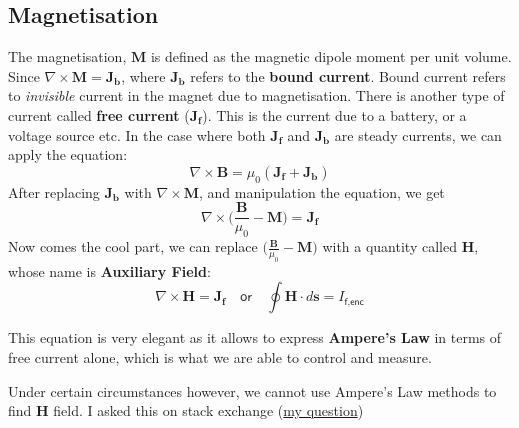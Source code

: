 \subsection{Magnetisation}
The magnetisation, $\mathbf{M}$ is defined as the magnetic dipole moment per unit volume.
Since $\nabla \times \mathbf{M}=\mathbf{J_b}$, where $\mathbf{J_b}$ refers to the \textbf{bound current}. Bound current refers to \textit{invisible} current in the magnet due to magnetisation. There is another type of current called \textbf{free current} ($\mathbf{J_f}$). This is the current due to a battery, or a voltage source etc. In the case where both $\mathbf{J_f}$ and $\mathbf{J_b}$ are steady currents, we can apply the equation:
\begin{equation}
    \nabla \times \mathbf{B} = \mu_0 (\mathbf{J_f}+\mathbf{J_b})
\end{equation}
After replacing $\mathbf{J_b}$ with $\nabla \times \mathbf{M}$, and manipulation the equation, we get
\begin{equation}
    \nabla \times \bigg(\frac{\mathbf{B}}{\mu_0}-\mathbf{M}\bigg)=\mathbf{J_f}
\end{equation}
Now comes the cool part, we can replace $\big(\frac{\mathbf{B}}{\mu_0}-\mathbf{M}\big)$ with a quantity called $\mathbf{H}$, whose name is \textbf{Auxiliary Field}:
\begin{equation}
    \boxed{\nabla \times \mathbf{H}=\mathbf{J_f}}
    \quad\textsf{or}\quad
    \boxed{\oint \mathbf{H} \cdot d\mathbf{s} = I_\textsf{f,enc}}
\end{equation}

This equation is very elegant as it allows to express \textbf{Ampere's Law} in terms of free current alone, which is what we are able to control and measure.

Under certain circumstances however, we cannot use Ampere's Law methods to find $\mathbf{H}$ field. I asked this on stack exchange (\href{https://physics.stackexchange.com/questions/675083/when-can-we-use-amp%c3%a8res-law-methods-to-find-mathbfh-field}{my question})


